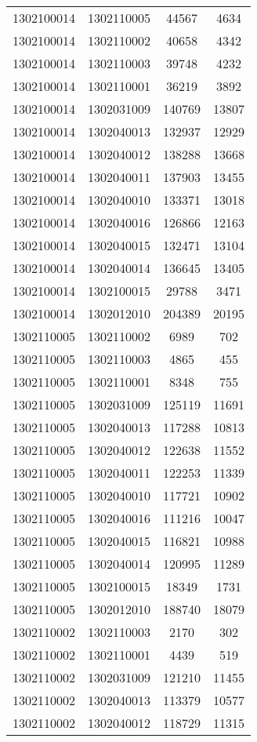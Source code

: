 \begin{longtable}{llcc}
1302100014 & 1302110005 & 44567 & 4634\\
1302100014 & 1302110002 & 40658 & 4342\\
1302100014 & 1302110003 & 39748 & 4232\\
1302100014 & 1302110001 & 36219 & 3892\\
1302100014 & 1302031009 & 140769 & 13807\\
1302100014 & 1302040013 & 132937 & 12929\\
1302100014 & 1302040012 & 138288 & 13668\\
1302100014 & 1302040011 & 137903 & 13455\\
1302100014 & 1302040010 & 133371 & 13018\\
1302100014 & 1302040016 & 126866 & 12163\\
1302100014 & 1302040015 & 132471 & 13104\\
1302100014 & 1302040014 & 136645 & 13405\\
1302100014 & 1302100015 & 29788 & 3471\\
1302100014 & 1302012010 & 204389 & 20195\\
1302110005 & 1302110002 & 6989 & 702\\
1302110005 & 1302110003 & 4865 & 455\\
1302110005 & 1302110001 & 8348 & 755\\
1302110005 & 1302031009 & 125119 & 11691\\
1302110005 & 1302040013 & 117288 & 10813\\
1302110005 & 1302040012 & 122638 & 11552\\
1302110005 & 1302040011 & 122253 & 11339\\
1302110005 & 1302040010 & 117721 & 10902\\
1302110005 & 1302040016 & 111216 & 10047\\
1302110005 & 1302040015 & 116821 & 10988\\
1302110005 & 1302040014 & 120995 & 11289\\
1302110005 & 1302100015 & 18349 & 1731\\
1302110005 & 1302012010 & 188740 & 18079\\
1302110002 & 1302110003 & 2170 & 302\\
1302110002 & 1302110001 & 4439 & 519\\
1302110002 & 1302031009 & 121210 & 11455\\
1302110002 & 1302040013 & 113379 & 10577\\
1302110002 & 1302040012 & 118729 & 11315\\

\end{longtable}
